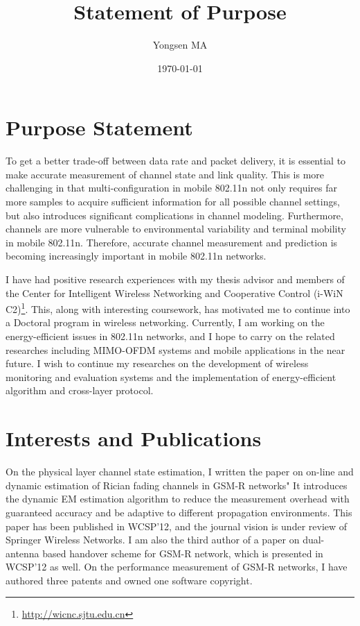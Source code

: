 \documentclass{article}
\title{Statement of Purpose}
\author{Yongsen MA}
\date{\today}
\begin{document}
  \maketitle%

\section{Purpose Statement}
 
To get a better trade-off between data rate and packet delivery, it is essential to make accurate measurement of channel state and link quality. This is more challenging in that multi-configuration in mobile 802.11n not only requires far more samples to acquire sufficient information for all possible channel settings, but also introduces significant complications in channel modeling. Furthermore, channels are more vulnerable to environmental variability and terminal mobility in mobile 802.11n. Therefore, accurate channel measurement and prediction is becoming increasingly important in mobile 802.11n networks.

I have had positive research experiences with my thesis advisor and members of the Center for Intelligent Wireless Networking and Cooperative Control (i-WiN C2)\footnote{\url{http://wicnc.sjtu.edu.cn}}. This, along with interesting coursework, has motivated me to continue into a Doctoral program in wireless networking. Currently, I am working on the energy-efficient issues in 802.11n networks, and I hope to carry on the related researches including MIMO-OFDM systems and mobile applications in the near future. I wish to continue my researches on the development of wireless monitoring and evaluation systems and the implementation of energy-efficient algorithm and cross-layer protocol.

\section{Interests and Publications}

On the physical layer channel state estimation, I written the paper on on-line and dynamic estimation of Rician fading channels in GSM-R networks" It introduces the dynamic EM estimation algorithm to reduce the measurement overhead with guaranteed accuracy and be adaptive to different propagation environments. This paper has been published in WCSP'12, and the journal vision is under review of Springer Wireless Networks. I am also the third author of a paper on dual-antenna based handover scheme for GSM-R network, which is presented in WCSP'12 as well. On the performance measurement of GSM-R networks, I have authored three patents and owned one software copyright.
\end{document}
